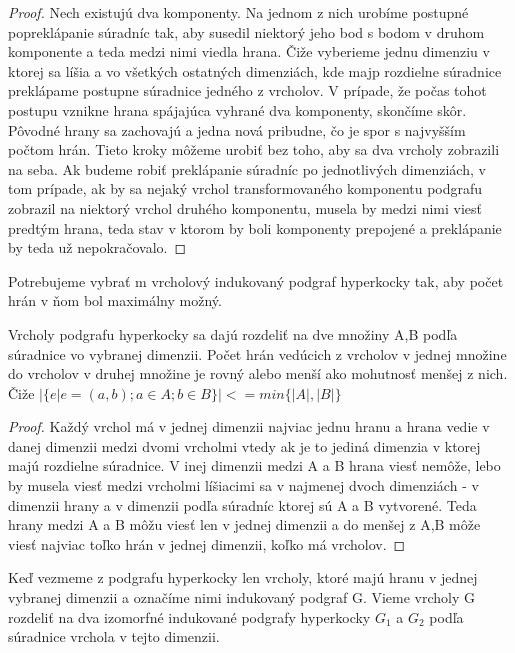 \begin{proof}
Nech existujú dva komponenty. Na jednom z nich urobíme 
postupné popreklápanie súradníc tak, aby susedil niektorý jeho bod s bodom
v druhom komponente a teda medzi nimi viedla hrana. Čiže vyberieme jednu
dimenziu v ktorej sa líšia a vo všetkých ostatných dimenziách, kde majp
rozdielne súradnice preklápame postupne súradnice jedného z vrcholov. 
V prípade, že počas tohot postupu vznikne hrana spájajúca vyhrané dva
komponenty, skončíme skôr. Pôvodné hrany sa
zachovajú a jedna nová pribudne, čo je spor s najvyšším počtom hrán.
Tieto kroky môžeme urobiť bez toho, aby sa dva vrcholy zobrazili na seba.
Ak budeme robiť preklápanie súradníc po jednotlivých dimenziách,
v tom prípade, ak by sa nejaký vrchol transformovaného komponentu
podgrafu zobrazil na niektorý vrchol druhého komponentu, musela by 
medzi nimi viesť predtým hrana, teda stav v ktorom by boli komponenty
prepojené a preklápanie by teda už nepokračovalo.
\end{proof}

Potrebujeme vybrať m vrcholový indukovaný podgraf hyperkocky tak, aby počet 
hrán v ňom bol maximálny možný.

\begin{lem}
Vrcholy podgrafu hyperkocky sa dajú rozdeliť na dve množiny A,B podľa súradnice vo
vybranej dimenzii. Počet hrán vedúcich z vrcholov v jednej množine do
vrcholov v druhej množine je rovný alebo menší ako mohutnosť menšej z nich.
Čiže $|\{e|e = (a,b);a \in A; b \in B\}| <= min\{|A|,|B|\}$
\end{lem}
\begin{proof}
Každý vrchol má v jednej dimenzii najviac jednu hranu a hrana vedie v
danej dimenzii medzi dvomi vrcholmi vtedy ak je to jediná dimenzia v ktorej
majú rozdielne súradnice. V inej dimenzii medzi A a B hrana viesť nemôže,
lebo by musela viesť medzi vrcholmi líšiacimi sa v najmenej dvoch 
dimenziách - v dimenzii hrany a v dimenzii podľa súradníc ktorej 
sú A a B vytvorené. Teda hrany medzi A a B môžu viesť len v jednej dimenzii
a do menšej z A,B môže viesť najviac toľko hrán v jednej dimenzii, koľko má
vrcholov.
\end{proof}

\begin{lem}
\label{izomorfne}
Keď vezmeme z podgrafu hyperkocky len vrcholy, ktoré majú hranu v jednej
vybranej dimenzii a označíme nimi indukovaný podgraf G. Vieme vrcholy G
rozdeliť na dva izomorfné indukované podgrafy hyperkocky $G_{1}$ a $G_{2}$
podľa súradnice vrchola v tejto dimenzii.
\end{lem}


